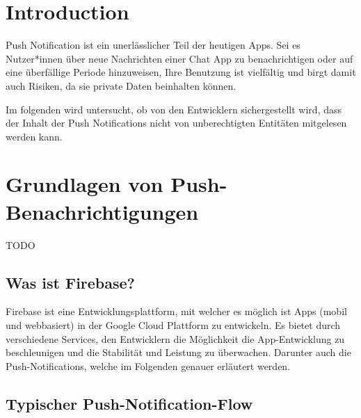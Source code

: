 \documentclass[sigconf]{acmart}
\begin{document}
\section{Introduction}

Push Notification ist ein unerlässlicher Teil der heutigen Apps. 
Sei es Nutzer*innen über neue Nachrichten einer Chat App 
zu benachrichtigen oder auf eine überfällige Periode hinzuweisen, 
Ihre Benutzung ist vielfältig und birgt damit auch Risiken, da sie 
private Daten beinhalten können.

Im folgenden wird untersucht, ob von den Entwicklern
sichergestellt wird, dass der Inhalt der
Push Notifications nicht von unberechtigten Entitäten mitgelesen 
werden kann.

\section{Grundlagen von Push-Benachrichtigungen}
TODO

\subsection{Was ist Firebase?}

Firebase ist eine Entwicklungsplattform, mit welcher es möglich ist 
Apps (mobil und webbasiert) in der Google Cloud Plattform zu entwickeln.
Es bietet durch verschiedene Services, den Entwicklern die Möglichkeit 
die App-Entwicklung zu beschleunigen und die Stabilität und Leistung 
zu überwachen. Darunter auch die Push-Notifications, welche im Folgenden 
genauer erläutert werden.\cite{cloudwuerdig}

\subsection{Typischer Push-Notification-Flow}
\end{document}
